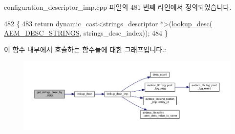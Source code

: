 configuration\+\_\+descriptor\+\_\+imp.\+cpp 파일의 481 번째 라인에서 정의되었습니다.


\begin{DoxyCode}
482 \{
483     \textcolor{keywordflow}{return} \textcolor{keyword}{dynamic\_cast<}strings\_descriptor *\textcolor{keyword}{>}(\hyperlink{classavdecc__lib_1_1configuration__descriptor__imp_a265e068ed32f7c3694417ffe2c382309}{lookup\_desc}(
      \hyperlink{namespaceavdecc__lib_ac7b7d227e46bc72b63ee9e9aae15902fa526663b7fb24c091547f86797eec03e0}{AEM\_DESC\_STRINGS}, strings\_desc\_index));
484 \}
\end{DoxyCode}


이 함수 내부에서 호출하는 함수들에 대한 그래프입니다.\+:
\nopagebreak
\begin{figure}[H]
\begin{center}
\leavevmode
\includegraphics[width=350pt]{classavdecc__lib_1_1configuration__descriptor__imp_a61225c4845898e23fc6d292ce6bd66b8_cgraph}
\end{center}
\end{figure}


